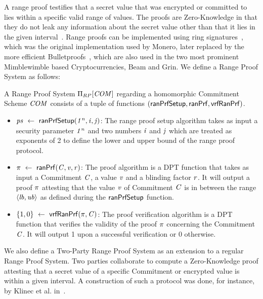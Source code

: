 A range proof testifies that a secret value that was encrypted or committed to lies within a specific valid range of values.
The proofs are Zero-Knowledge in that they do not leak any information about the secret value other than that it lies in the given interval~\cite{bunz2018bulletproofs}.
Range proofs can be implemented using ring signatures~\cite{noether2016ring}, which was the original implementation used by Monero, later replaced by the more efficient Bulletproofs~\cite{bunz2018bulletproofs}, which are also used in the two most prominent Mimblewimble based Cryptocurrencies, Beam and Grin.
We define a Range Proof System as follows:

\begin{definition}\label{def:pre:rangeproof}
    A Range Proof System $\Pi_{RP}[\mathit{COM}]$ regarding a homomorphic Commitment Scheme $\mathit{COM}$ consists of a tuple of functions $(\mathsf{ranPrfSetup}, \mathsf{ranPrf}, \mathsf{vrfRanPrf})$.
    \begin{itemize}
        \item $\mathit{ps} ~\leftarrow~ \mathsf{ranPrfSetup}(\mathit{1^n},\mathit{i},\mathit{j})$: The range proof setup algorithm takes as input a security parameter $\mathit{1^n}$ and two numbers $\mathit{i}$ and $\mathit{j}$ which are treated as exponents of 2 to define the lower and upper bound of the range proof protocol.
        \item $\pi ~\leftarrow~ \mathsf{ranPrf}(\mathit{C},\mathit{v},\mathit{r})$: The proof algorithm is a DPT function that takes as input a Commitment $\mathit{C}$, a value $\mathit{v}$ and a blinding factor $\mathit{r}$.
        It will output a proof $\pi$ attesting that the value $\mathit{v}$ of Commitment $\mathit{C}$ is in between the range $\langle \mathit{lb}, \mathit{ub} \rangle$ as defined during the $\mathsf{ranPrfSetup}$ function.
        \item $\{1,0\} ~\leftarrow~ \mathsf{vrfRanPrf}(\pi,\mathit{C})$: The proof verification algorithm is a DPT function that verifies the validity of the proof $\pi$ concerning the Commitment $\mathit{C}$.
        It will output 1 upon a successful verification or 0 otherwise.
    \end{itemize}
\end{definition}

We also define a Two-Party Range Proof System as an extension to a regular Range Proof System. Two parties collaborate to compute a Zero-Knowledge proof attesting that a secret value of a specific Commitment or encrypted value is within a given interval.
A construction of such a protocol was done, for instance, by Klinec et al. in~\cite{klinec2020privacy}.

